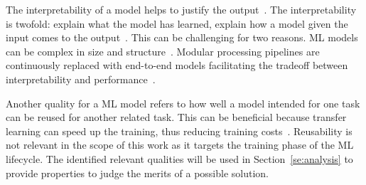 The interpretability of a model helps to justify the output~\citep{ashmore_assuring_2021}.
The interpretability is twofold: explain what the model has learned, explain how a model given the
input comes to the output~\citep{vogelsang_requirements_2019}.
This can be challenging for two reasons.
\ac{ML} models can be complex in size and structure~\citep{ashmore_assuring_2021}.
Modular processing pipelines are continuously replaced with end-to-end
models facilitating the tradeoff between interpretability and
performance~\cite{arpteg_software_2018}.

Another quality for a \ac{ML} model refers to how well a model intended for one task can be reused
for another related task.
This can be beneficial because transfer learning can speed up the training, thus reducing training
costs~\citep{ashmore_assuring_2021}.
Reusability is not relevant in the scope of this work as it targets the training phase of the
\ac{ML} lifecycle.
The identified relevant qualities will be used in Section~\ref{se:analysis} to provide
properties to judge the merits of a possible solution.
